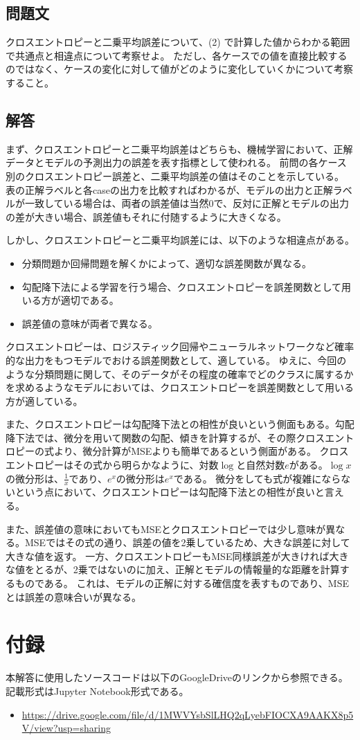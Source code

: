 \documentclass{article}[jsarticle]
\begin{document}
\subsection{問題文}
クロスエントロピーと二乗平均誤差について、(2) で計算した値からわかる範囲で共通点と相違点について考察せよ。
ただし、各ケースでの値を直接比較するのではなく、ケースの変化に対して値がどのように変化していくかについて考察すること。
\subsection{解答}
まず、クロスエントロピーと二乗平均誤差はどちらも、機械学習において、正解データとモデルの予測出力の誤差を表す指標として使われる。
前問の各ケース別のクロスエントロピー誤差と、二乗平均誤差の値はそのことを示している。
表の正解ラベルと各caseの出力を比較すればわかるが、モデルの出力と正解ラベルが一致している場合は、両者の誤差値は当然0で、反対に正解とモデルの出力の差が大きい場合、誤差値もそれに付随するように大きくなる。\par
しかし、クロスエントロピーと二乗平均誤差には、以下のような相違点がある。
\begin{itemize}
    \item 分類問題か回帰問題を解くかによって、適切な誤差関数が異なる。
    \item 勾配降下法による学習を行う場合、クロスエントロピーを誤差関数として用いる方が適切である。
    \item 誤差値の意味が両者で異なる。
\end{itemize}
クロスエントロピーは、ロジスティック回帰やニューラルネットワークなど確率的な出力をもつモデルでおける誤差関数として、適している。
ゆえに、今回のような分類問題に関して、そのデータがその程度の確率でどのクラスに属するかを求めるようなモデルにおいては、クロスエントロピーを誤差関数として用いる方が適している。\par 
また、クロスエントロピーは勾配降下法との相性が良いという側面もある。勾配降下法では、微分を用いて関数の勾配、傾きを計算するが、その際クロスエントロピーの式より、微分計算がMSEよりも簡単であるという側面がある。
クロスエントロピーはその式から明らかなように、対数$\log$と自然対数$e$がある。$\log x$の微分形は、$\frac{1}{x}$であり、$e^{x}$の微分形は$e^{x}$である。
微分をしても式が複雑にならないという点において、クロスエントロピーは勾配降下法との相性が良いと言える。\par

また、誤差値の意味においてもMSEとクロスエントロピーでは少し意味が異なる。MSEではその式の通り、誤差の値を2乗しているため、大きな誤差に対して大きな値を返す。
一方、クロスエントロピーもMSE同様誤差が大きければ大きな値をとるが、2乗ではないのに加え、正解とモデルの情報量的な距離を計算するものである。
これは、モデルの正解に対する確信度を表すものであり、MSEとは誤差の意味合いが異なる。\par


\section{付録}
本解答に使用したソースコードは以下のGoogleDriveのリンクから参照できる。
記載形式はJupyter Notebook形式である。
\begin{itemize}
    \item \url{https://drive.google.com/file/d/1MWVYsbSlLHQ2qLyebFIOCXA9AAKX8p5V/view?usp=sharing}
\end{itemize}
\end{document}

